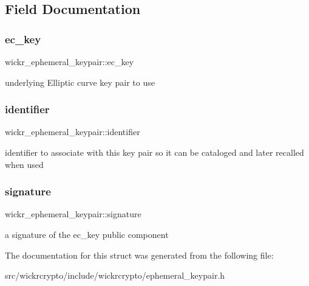 \subsection{Field Documentation}
\mbox{\label{structwickr__ephemeral__keypair_ad730ed9ba92e05d0a271edc838e548fe}} 
\subsubsection{\texorpdfstring{ec\_key}{ec\_key}}
{\footnotesize\ttfamily wickr\+\_\+ephemeral\+\_\+keypair\+::ec\+\_\+key}

underlying Elliptic curve key pair to use \mbox{\label{structwickr__ephemeral__keypair_a9220b37a7db764818406bcc84e3ba86b}} 
\subsubsection{\texorpdfstring{identifier}{identifier}}
{\footnotesize\ttfamily wickr\+\_\+ephemeral\+\_\+keypair\+::identifier}

identifier to associate with this key pair so it can be cataloged and later recalled when used \mbox{\label{structwickr__ephemeral__keypair_aea420be2397d798a560fa973be86228c}} 
\subsubsection{\texorpdfstring{signature}{signature}}
{\footnotesize\ttfamily wickr\+\_\+ephemeral\+\_\+keypair\+::signature}

a signature of the \textquotesingle{}ec\+\_\+key\textquotesingle{} public component 

The documentation for this struct was generated from the following file\+:\begin{DoxyCompactItemize}
\item 
src/wickrcrypto/include/wickrcrypto/ephemeral\+\_\+keypair.\+h\end{DoxyCompactItemize}
